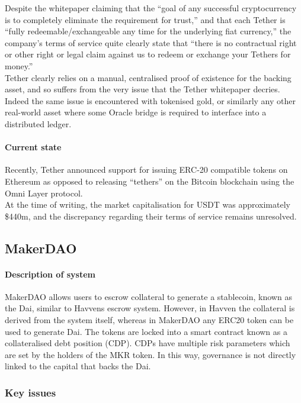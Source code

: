 Despite the whitepaper claiming that the ``goal of any successful cryptocurrency is to completely eliminate the requirement for trust,'' and that each Tether is ``fully redeemable/exchangeable any time for the underlying fiat currency,'' the company's terms of service quite clearly state that ``there is no contractual right or other right or legal claim against us to redeem or exchange your Tethers for money.'' \\

\noindent Tether clearly relies on a manual, centralised proof of existence for the backing asset, and so suffers from the very issue that the Tether whitepaper decries. Indeed the same issue is encountered with tokenised gold, or similarly any other real-world asset where some Oracle bridge is required to interface into a distributed ledger.

\paragraph{Current state}

Recently, Tether announced support for issuing ERC-20 compatible tokens on Ethereum as opposed to releasing ``tethers'' on the Bitcoin blockchain using the Omni Layer protocol. \\

\noindent At the time of writing, the market capitalisation for USDT was approximately \$440m, and the discrepancy regarding their terms of service remains unresolved. \\


\subsection{MakerDAO}
\paragraph{Description of system} MakerDAO allows users to escrow collateral to generate a stablecoin, known as the Dai, similar to Havvens escrow system. However, in Havven the collateral is derived from the system itself, whereas in MakerDAO any ERC20 token can be used to generate Dai. The tokens are locked into a smart contract known as a collateralised debt position (CDP). CDPs have multiple risk parameters which are set by the holders of the MKR token. In this way, governance is not directly linked to the capital that backs the Dai.

\subsubsection{Key issues}

